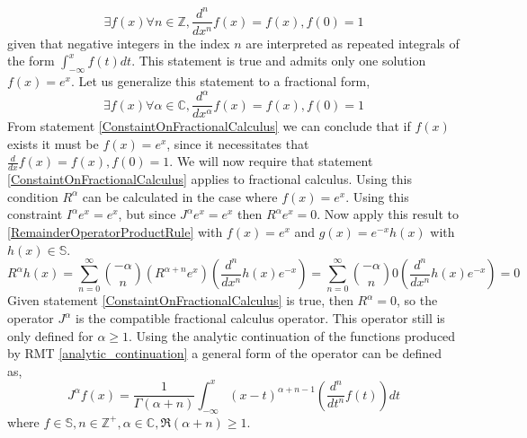 \documentclass[%
 onecolumn,
 amsmath, amssymb, aps, pra, 10pt
]{revtex4-2}
\begin{document}
\[\exists f(x) \forall n \in \mathbb{Z}, \frac{d^n}{dx^n}f(x) = f(x), f(0) = 1\]
given that negative integers in the index $n$ are interpreted as repeated integrals of the form $\int_{-\infty}^x f(t)dt$. This statement is true and admits only one solution $f(x) = e^x$. Let us generalize this statement to a fractional form,
\begin{equation}
\exists f(x) \forall \alpha \in \mathbb{C}, \frac{d^\alpha}{dx^\alpha}f(x) = f(x), f(0) = 1
\label{ConstaintOnFractionalCalculus}
\end{equation}
From statement \eqref{ConstaintOnFractionalCalculus} we can conclude that if $f(x)$ exists it must be $f(x) = e^x$, since it necessitates that $\frac{d}{dx}f(x) = f(x), f(0) = 1$. We will now require that statement \eqref{ConstaintOnFractionalCalculus} applies to fractional calculus. Using this condition $R^\alpha$ can be calculated in the case where $f(x) = e^x$. Using this constraint $I^\alpha e^x = e^x$, but since $J^\alpha e^x = e^x$ then $R^\alpha e^x = 0$. Now apply this result to \eqref{RemainderOperatorProductRule} with $f(x) = e^x$ and $g(x) = e^{-x}h(x)$ with $h(x) \in \mathbb{S}$.
\[R^\alpha h(x) = \sum_{n=0}^\infty \binom{-\alpha}{n}\left( R^{\alpha + n}e^x \right)\left( \frac{d^n}{dx^n} h(x)e^{-x}\right) = \sum_{n=0}^\infty \binom{-\alpha}{n} 0 \left( \frac{d^n}{dx^n} h(x)e^{-x}\right) = 0\]
Given statement \eqref{ConstaintOnFractionalCalculus} is true, then $R^\alpha = 0$, so the operator $J^{\alpha}$ is the compatible fractional calculus operator. This operator still is only defined for $\mathfrak{\alpha} \geq 1$. Using the analytic continuation of the functions produced by RMT \eqref{analytic_continuation} a general form of the operator can be defined as,
\begin{equation}
J^{\alpha}f(x) = \frac{1}{\Gamma(\alpha+n)}\int_{-\infty}^x (x-t)^{\alpha+n-1}\left( \frac{d^n}{dt^n} f(t) \right)dt
\label{fractional_calculus}
\end{equation}
where $f \in \mathbb{S}, n \in \mathbb{Z}^+, \alpha \in \mathbb{C}, \mathfrak{R}(\alpha + n) \geq 1$.
\end{document}
